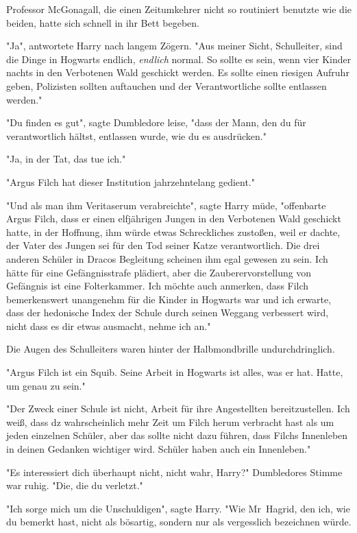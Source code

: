 {Professor McGonagall, die einen Zeitumkehrer nicht so routiniert benutzte wie die beiden, hatte sich schnell in ihr Bett begeben.

"Ja", antwortete Harry nach langem Zögern. "Aus meiner Sicht, Schulleiter, sind die Dinge in Hogwarts endlich, \emph{endlich} normal. So sollte es sein, wenn vier Kinder nachts in den Verbotenen Wald geschickt werden. Es sollte einen riesigen Aufruhr geben, Polizisten sollten auftauchen und der Verantwortliche sollte entlassen werden."

"Du finden es gut", sagte Dumbledore leise, "dass der Mann, den du für verantwortlich hältst, entlassen wurde, wie du es ausdrücken."

"Ja, in der Tat, das tue ich."

"Argus Filch hat dieser Institution jahrzehntelang gedient."

"Und als man ihm Veritaserum verabreichte", sagte Harry müde, "offenbarte Argus Filch, dass er einen elfjährigen Jungen in den Verbotenen Wald geschickt hatte, in der Hoffnung, ihm würde etwas Schreckliches zustoßen, weil er dachte, der Vater des Jungen sei für den Tod seiner Katze verantwortlich. Die drei anderen Schüler in Dracos Begleitung scheinen ihm egal gewesen zu sein. Ich hätte für eine Gefängnisstrafe plädiert, aber die Zauberervorstellung von Gefängnis ist eine Folterkammer. Ich möchte auch anmerken, dass Filch bemerkenswert unangenehm für die Kinder in Hogwarts war und ich erwarte, dass der hedonische Index der Schule durch seinen Weggang verbessert wird, nicht dass es dir etwas ausmacht, nehme ich an."

Die Augen des Schulleiters waren hinter der Halbmondbrille undurchdringlich.

"Argus Filch ist ein Squib. Seine Arbeit in Hogwarts ist alles, was er hat. Hatte, um genau zu sein."

"Der Zweck einer Schule ist nicht, Arbeit für ihre Angestellten bereitzustellen. Ich weiß, dass dz wahrscheinlich mehr Zeit um Filch herum verbracht hast als um jeden einzelnen Schüler, aber das sollte nicht dazu führen, dass Filchs Innenleben in deinen Gedanken wichtiger wird. Schüler haben auch ein Innenleben."

"Es interessiert dich überhaupt nicht, nicht wahr, Harry?" Dumbledores Stimme war ruhig. "Die, die du verletzt."

"Ich sorge mich um die Unschuldigen", sagte Harry. "Wie Mr~Hagrid, den ich, wie du bemerkt hast, nicht als bösartig, sondern nur als vergesslich bezeichnen würde.

}
